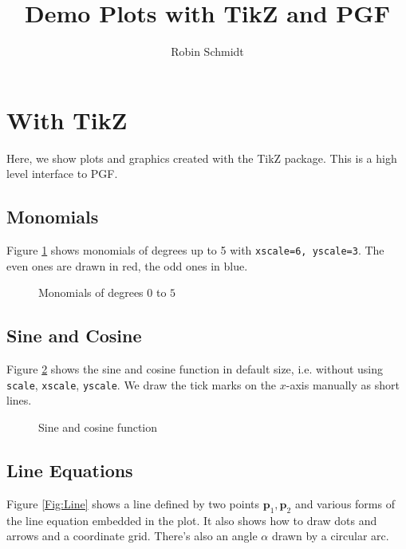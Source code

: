 



\title{Demo Plots with TikZ and PGF}
\author{Robin Schmidt}
\maketitle

\section{With TikZ}
Here, we show plots and graphics created with the TikZ package. This is a high level interface to PGF.

\subsection{Monomials}
Figure \ref{Fig:Monomials} shows monomials of degrees up to 5 with \verb|xscale=6, yscale=3|. The even ones are drawn in red, the odd ones in blue.

\begin{figure}[h]
\centering
\caption{Monomials of degrees $0$ to $5$}
\label{Fig:Monomials}
\pgfplotsset{width=8cm} 

\end{figure}

\subsection{Sine and Cosine}
Figure \ref{Fig:SineAndCosine} shows the sine and cosine function in default size, i.e. without using \verb|scale|, \verb|xscale|, \verb|yscale|. We draw the tick marks on the $x$-axis manually as short lines.

\begin{figure}[h]
\centering
\caption{Sine and cosine function}
\label{Fig:SineAndCosine}

\end{figure}

\subsection{Line Equations}
Figure \ref{Fig:Line} shows a line defined by two points $\mathbf{p}_1, \mathbf{p}_2$ and various forms of the line equation embedded in the plot. It also shows how to draw dots and arrows and a coordinate grid. There's also an angle $\alpha$ drawn by a circular arc.

